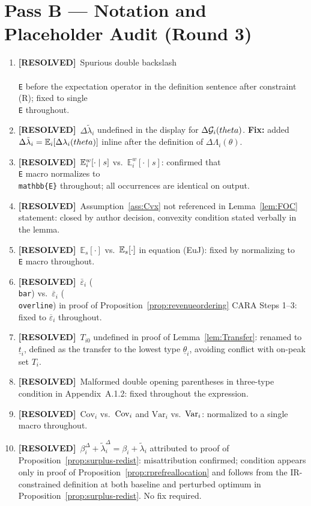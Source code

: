 \documentclass{class}
\newcommand{\ok}{\textcolor{ok}{\textbf{[RESOLVED]}}}
\begin{document}
\section*{Pass B --- Notation and Placeholder Audit (Round 3)}

\begin{enumerate}[leftmargin=1.5cm]
\item \ok\ Spurious double backslash \texttt{\\\\E} before the expectation operator in the definition sentence after constraint (R); fixed to single \texttt{\\E} throughout.
\item \ok\ $\Delta\tilde\lambda_i$ undefined in the display for $\Delta\mathcal{G}_i(theta)$. \textbf{Fix:} added $\Delta\tilde\lambda_i = \mathbb{E}_i[\Delta\lambda_i(theta)]$ inline after the definition of $\Delta\Lambda_i(\theta)$.
\item \ok\ $\mathbb{E}_i^w[\cdot\mid s]$ vs.\ $\mathbb{E}_i^w[\cdot\mid s]$: confirmed that \texttt{\\E} macro normalizes to \texttt{\\mathbb\{E\}} throughout; all occurrences are identical on output.
\item \ok\ Assumption~\ref{ass:Cvx} not referenced in Lemma~\ref{lem:FOC} statement: closed by author decision, convexity condition stated verbally in the lemma.
\item \ok\ $\mathbb{E}_s[\cdot]$ vs.\ $\mathbb{E}_s[\cdot]$ in equation (EuJ): fixed by normalizing to \texttt{\\E} macro throughout.
\item \ok\ $\bar\varepsilon_i$ (\texttt{\\bar}) vs.\ $\overline\varepsilon_i$ (\texttt{\\overline}) in proof of Proposition~\ref{prop:revenueordering} CARA Steps 1--3: fixed to $\overline\varepsilon_i$ throughout.
\item \ok\ $T_{i0}$ undefined in proof of Lemma~\ref{lem:Transfer}: renamed to $\underline{t}_i$, defined as the transfer to the lowest type $\underline\theta_i$, avoiding conflict with on-peak set $T_i$.
\item \ok\ Malformed double opening parentheses in three-type condition in Appendix~A.1.2: fixed throughout the expression.
\item \ok\ $\mathrm{Cov}_i$ vs.\ $\mathrm{Cov}_i$ and $\mathrm{Var}_i$ vs.\ $\mathrm{Var}_i$: normalized to a single macro throughout.
\item \ok\ $\beta_i^\Delta+\tilde\lambda_i^\Delta=\beta_i+\tilde\lambda_i$ attributed to proof of Proposition~\ref{prop:surplus-redist}: misattribution confirmed; condition appears only in proof of Proposition~\ref{prop:rprefreallocation} and follows from the IR-constrained definition at both baseline and perturbed optimum in Proposition~\ref{prop:surplus-redist}. No fix required.

\end{enumerate}
\end{document}
